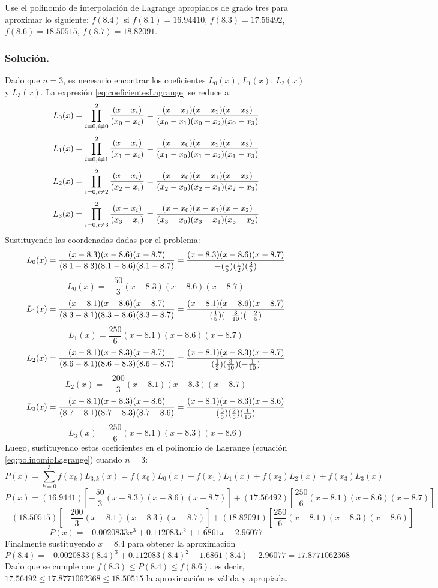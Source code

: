 \begin{example}{\rm Use el polinomio de interpolación de Lagrange apropiados de grado tres para aproximar lo siguiente: $f(8.4)$ si 
	$f(8.1)=16.94410$, $f(8.3)=17.56492$, $f(8.6)=18.50515$, $f(8.7)=18.82091$.
	\subsubsection*{Solución.} Dado que $n=3$, es necesario encontrar los coeficientes $L_0(x)$, $L_1(x)$, $L_2(x)$ y $L_3(x)$. 
	La expresión \ref{eq:coeficientesLagrange} 
		se reduce a:
			$$L_0(x) = \prod_{i=0, i\not= 0}^{2} {(x-x_i) \over (x_0 - x_i)} = {(x-x_1)(x-x_2)(x-x_3)\over (x_0-x_1)(x_0-x_2)(x_0-x_3)}$$	
			$$L_1(x) = \prod_{i=0, i\not= 1}^{2} {(x-x_i) \over (x_1 - x_i)} = {(x-x_0)(x-x_2)(x-x_3)\over (x_1-x_0)(x_1-x_2)(x_1-x_3)}$$	
			$$L_2(x) = \prod_{i=0, i\not= 2}^{2} {(x-x_i) \over (x_2 - x_i)} = {(x-x_0)(x-x_1)(x-x_3)\over (x_2-x_0)(x_2-x_1)(x_2-x_3)}$$
			$$L_3(x) = \prod_{i=0, i\not= 3}^{2} {(x-x_i) \over (x_3 - x_i)} = {(x-x_0)(x-x_1)(x-x_2)\over (x_3-x_0)(x_3-x_1)(x_3-x_2)}$$
		Sustituyendo las coordenadas dadas por el problema:
			$$L_0(x) = {(x-8.3)(x-8.6)(x-8.7)\over (8.1-8.3)(8.1-8.6)(8.1-8.7)} = {(x-8.3)(x-8.6)(x-8.7)\over -(\frac{1}{5})(\frac{1}{2})(\frac{3}{5})}$$
			$$L_0(x) = -\frac{50}{3}(x-8.3)(x-8.6)(x-8.7)$$
			$$L_1(x) = {(x-8.1)(x-8.6)(x-8.7)\over (8.3-8.1)(8.3-8.6)(8.3-8.7)} = {(x-8.1)(x-8.6)(x-8.7)\over (\frac{1}{5})(-\frac{3}{10})(-\frac{2}{5})}$$
			$$L_1(x) = \frac{250}{6}(x-8.1)(x-8.6)(x-8.7)$$
			$$L_2(x) = {(x-8.1)(x-8.3)(x-8.7)\over (8.6-8.1)(8.6-8.3)(8.6-8.7)} = {(x-8.1)(x-8.3)(x-8.7)\over (\frac{1}{2})(\frac{3}{10})(-\frac{1}{10})}$$
			$$L_2(x) = -\frac{200}{3}(x-8.1)(x-8.3)(x-8.7)$$
			$$L_3(x) = {(x-8.1)(x-8.3)(x-8.6)\over (8.7-8.1)(8.7-8.3)(8.7-8.6)} = {(x-8.1)(x-8.3)(x-8.6)\over (\frac{3}{5})(\frac{2}{5})(\frac{1}{10})}$$
			$$L_3(x) = \frac{250}{6}(x-8.1)(x-8.3)(x-8.6)$$	
		Luego, sustituyendo estos coeficientes en el polinomio de Lagrange (ecuación \ref{eq:polinomioLagrange}) cuando $n=3$:
			$$P(x) = \sum_{k=0}^3 f(x_k)L_{3,k}(x) = f(x_0)L_0(x) + f(x_1)L_1(x) + f(x_2)L_2(x) + f(x_3)L_3(x)$$
			$$P(x) = (16.9441)\left[-\frac{50}{3} (x-8.3)(x-8.6)(x-8.7) \right] + (17.56492)\left[\frac{250}{6} (x-8.1)(x-8.6)(x-8.7) \right]$$
			$$+ (18.50515)\left[-\frac{200}{3} (x-8.1)(x-8.3)(x-8.7) \right] + (18.82091)\left[\frac{250}{6} (x-8.1)(x-8.3)(x-8.6) \right]$$
			$$P(x) = -0.0020833x^3 + 0.112083x^2 + 1.6861x - 2.96077$$
		Finalmente sustituyendo $x=8.4$ para obtener la aproximación
			$$P(8.4) = -0.0020833(8.4)^3 + 0.112083(8.4)^2 + 1.6861(8.4) - 2.96077 = 17.8771062368$$
		Dado que se cumple que $f(8.3)\leq P(8.4)\leq f(8.6)$, es decir, $17.56492 \leq 17.8771062368 \leq 18.50515$ la aproximación es válida y apropiada.
		
}\end{example}


